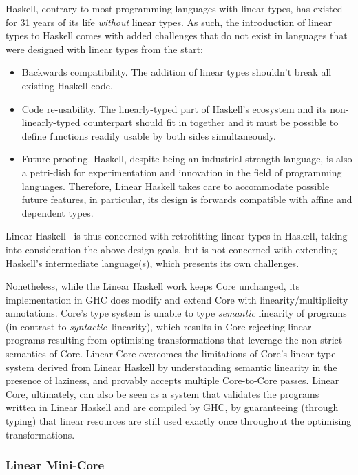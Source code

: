 \documentclass[acmsmall, screen, review]{acmart}
\begin{document}
Haskell, contrary to most programming languages with linear types, has existed
for 31 years of its life \emph{without} linear types. As such, the introduction
of linear types to Haskell comes with added challenges that do not exist in
languages that were designed with linear types from the start:
%
\begin{itemize}
    \item Backwards compatibility. The addition of linear types shouldn't break
        all existing Haskell code.
    \item Code re-usability. The linearly-typed part of Haskell's ecosystem and
        its non-linearly-typed counterpart should fit in together and it must be
        possible to define functions readily usable by both sides
        simultaneously.
    \item Future-proofing. Haskell, despite being an
        industrial-strength language, is also a petri-dish for experimentation
        and innovation in the field of programming languages. Therefore, Linear
        Haskell takes care to accommodate possible future features, in
        particular, its design is forwards compatible with affine and dependent
        types.
\end{itemize}
%
Linear Haskell~\cite{cite:linearhaskell} is thus concerned with retrofitting
linear types in Haskell, taking into consideration the above design goals, but
is not concerned with extending Haskell's intermediate language(s),
which presents its own challenges. 

Nonetheless, while the Linear Haskell work keeps Core unchanged, its
implementation in GHC does modify and extend Core with linearity/multiplicity
annotations. Core's type system is unable to type \emph{semantic} linearity of
programs (in contrast to \emph{syntactic} linearity), which results in Core
rejecting linear programs resulting from optimising transformations that
leverage the non-strict semantics of Core.
%
Linear Core overcomes the limitations of Core's linear type system derived from
Linear Haskell by understanding semantic linearity in the presence of laziness,
and provably accepts multiple Core-to-Core passes. Linear Core, ultimately, can
also be seen as a system that validates the programs written in Linear Haskell
and are compiled by GHC, by guaranteeing (through typing) that linear resources
are still used exactly once throughout the optimising transformations.

\subsubsection{Linear Mini-Core\label{sec:linear-mini-core}}
\end{document}
